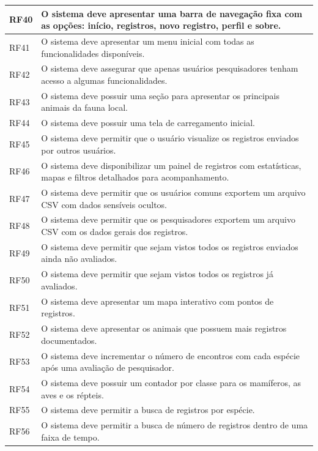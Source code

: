 \begin{longtable}{@{}p{1.5cm}p{13cm}@{}}
    RF40 & O sistema deve apresentar uma barra de navegação fixa com as opções: início, registros, 
    novo registro, perfil e sobre. \\ \hline
    RF41 & O sistema deve apresentar um menu inicial com todas as funcionalidades disponíveis. \\ \hline
    RF42 & O sistema deve assegurar que apenas usuários pesquisadores tenham acesso a algumas funcionalidades. \\ \hline
    RF43 & O sistema deve possuir uma seção para apresentar os principais animais da fauna local. \\ \hline
    RF44 & O sistema deve possuir uma tela de carregamento inicial. \\ \hline

    RF45 & O sistema deve permitir que o usuário visualize os registros enviados por outros usuários. \\ \hline
    RF46 & O sistema deve disponibilizar um painel de registros com estatísticas, mapas e filtros detalhados para acompanhamento. \\ \hline
    RF47 & O sistema deve permitir que os usuários comuns exportem um arquivo CSV com dados sensíveis ocultos. \\ \hline
    RF48 & O sistema deve permitir que os pesquisadores exportem um arquivo CSV com os dados gerais dos registros. \\ \hline
    RF49 & O sistema deve permitir que sejam vistos todos os registros enviados ainda não avaliados. \\ \hline
    RF50 & O sistema deve permitir que sejam vistos todos os registros já avaliados. \\ \hline
    RF51 & O sistema deve apresentar um mapa interativo com pontos de registros. \\ \hline
    RF52 & O sistema deve apresentar os animais que possuem mais registros documentados. \\ \hline
    RF53 & O sistema deve incrementar o número de encontros com cada espécie após uma avaliação de pesquisador. \\ \hline
    RF54 & O sistema deve possuir um contador por classe para os mamíferos, as aves e os répteis. \\ \hline
    RF55 & O sistema deve permitir a busca de registros por espécie. \\ \hline
    RF56 & O sistema deve permitir a busca de número de registros dentro de uma faixa de tempo. \\ \hline


\end{longtable}
